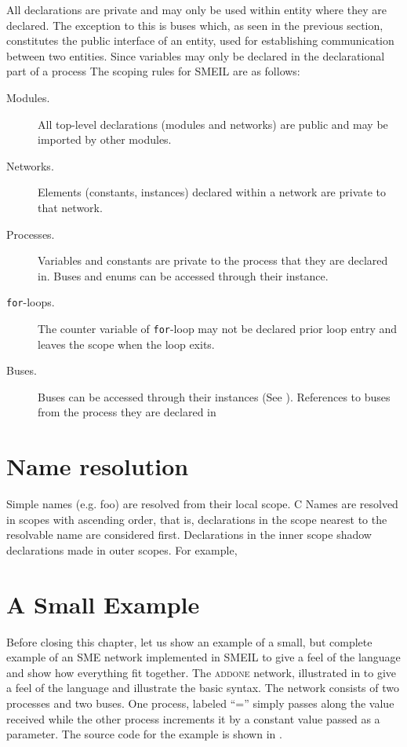 All declarations are private and may only be used within entity where they are
declared. The exception to this is buses which, as seen in the previous section,
constitutes the public interface of an entity, used for establishing
communication between two entities. Since variables may only be declared in the
declarational part of a process The scoping rules for SMEIL are as follows:

\begin{description}
  \item[Modules.] All top-level declarations (modules and networks) are public and
    may be imported by other modules.
  \item[Networks.] Elements (constants, instances) declared within a network are
    private to that network.
  \item[Processes.] Variables and constants are private to the process that they
    are declared in. Buses and enums can be accessed through their instance.
  \item[\texttt{for}-loops.] The counter variable of \texttt{for}-loop may not
    be declared prior loop entry and leaves the scope when the loop exits.
  \item[Buses.] Buses  can be
    accessed through their instances (See ). References to
    buses from the process they are declared in 
\end{description}



\section{Name resolution}
Simple names (e.g. {\ttfamily foo}) are resolved from their local scope. C
Names are resolved in scopes with ascending order, that is, declarations in the
scope nearest to the resolvable name are considered first. Declarations in the
inner scope shadow declarations made in outer scopes. For example, 

\section{A Small Example}
Before closing this chapter, let us show an example of a small, but complete
example of an SME network implemented in SMEIL to give a feel of the language
and show how everything fit together. The \textsc{addone} network,
illustrated in  to give a feel of the language and illustrate
the basic syntax. The network consists of two processes and two buses. One
process, labeled ``='' simply passes along the value received while the other
process increments it by a constant value passed as a parameter. The source code
for the example is shown in .

